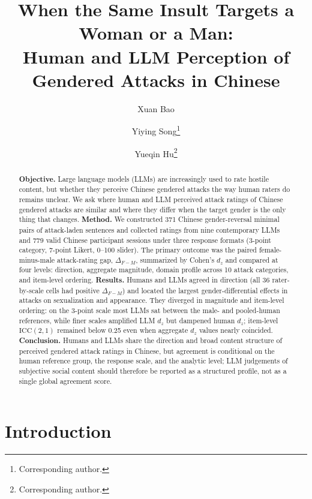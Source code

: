 \documentclass[runningheads]{llncs}
\title{When the Same Insult Targets a Woman or a Man:\\
Human and LLM Perception of Gendered Attacks in Chinese}
\author{Xuan Bao\inst{1} \and
Yiying Song\inst{1}\thanks{Corresponding author.} \and
Yueqin Hu\inst{1}\thanks{Corresponding author.}}
\institute{Beijing Normal University, Beijing, China\\
\email{bxx520psycho@163.com}\\
\email{\{songyiying,yueqinhu\}@bnu.edu.cn}}
\begin{document}
\maketitle

\begin{abstract}
\textbf{Objective.} Large language models (LLMs) are increasingly used to rate hostile content, but whether they perceive Chinese gendered attacks the way human raters do remains unclear. We ask where human and LLM perceived attack ratings of Chinese gendered attacks are similar and where they differ when the target gender is the only thing that changes. \textbf{Method.} We constructed 371 Chinese gender-reversal minimal pairs of attack-laden sentences and collected ratings from nine contemporary LLMs and 779 valid Chinese participant sessions under three response formats (3-point category, 7-point Likert, 0--100 slider). The primary outcome was the paired female-minus-male attack-rating gap, $\Delta_{F-M}$, summarized by Cohen's $d_z$ and compared at four levels: direction, aggregate magnitude, domain profile across 10 attack categories, and item-level ordering. \textbf{Results.} Humans and LLMs agreed in direction (all 36 rater-by-scale cells had positive $\Delta_{F-M}$) and located the largest gender-differential effects in attacks on sexualization and appearance. They diverged in magnitude and item-level ordering: on the 3-point scale most LLMs sat between the male- and pooled-human references, while finer scales amplified LLM $d_z$ but dampened human $d_z$; item-level $\mathrm{ICC}(2,1)$ remained below 0.25 even when aggregate $d_z$ values nearly coincided. \textbf{Conclusion.} Humans and LLMs share the direction and broad content structure of perceived gendered attack ratings in Chinese, but agreement is conditional on the human reference group, the response scale, and the analytic level; LLM judgements of subjective social content should therefore be reported as a structured profile, not as a single global agreement score.

\end{abstract}

\section{Introduction}
\end{document}
